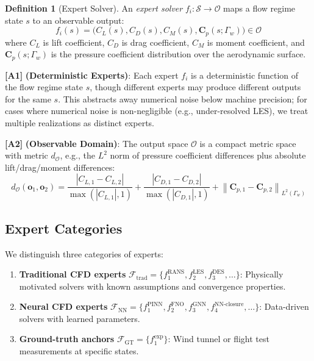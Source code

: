 \documentclass[11pt,a4paper]{article}
\theoremstyle{definition}
\newtheorem{definition}[theorem]{Definition}
\theoremstyle{remark}
\newcommand{\assumptionTag}[1]{\textsf{\textbf{[A#1]}}}
\newcommand{\norm}[1]{\left\lVert#1\right\rVert}
\begin{document}
\begin{definition}[Expert Solver]
An \emph{expert solver} $f_i: \mathcal{S} \to \mathcal{O}$ maps a flow regime state $s$ to an observable output:
\begin{equation}
f_i(s) = \big( C_L(s), C_D(s), C_M(s), \mathbf{C}_p(s; \Gamma_w) \big) \in \mathcal{O}
\label{eq:expert}
\end{equation}
\noindent where $C_L$ is lift coefficient, $C_D$ is drag coefficient, $C_M$ is moment coefficient, and $\mathbf{C}_p(s; \Gamma_w)$ is the pressure coefficient distribution over the aerodynamic surface.
\end{definition}

\assumptionTag{1} \textbf{(Deterministic Experts)}: Each expert $f_i$ is a deterministic function of the flow regime state $s$, though different experts may produce different outputs for the same $s$.
This abstracts away numerical noise below machine precision; for cases where numerical noise is non-negligible (e.g., under-resolved LES), we treat multiple realizations as distinct experts.

\assumptionTag{2} \textbf{(Observable Domain)}: The output space $\mathcal{O}$ is a compact metric space with metric $d_{\mathcal{O}}$, e.g., the $L^2$ norm of pressure coefficient differences plus absolute lift/drag/moment differences:
\begin{equation}
d_{\mathcal{O}}(\mathbf{o}_1, \mathbf{o}_2) = \frac{|C_{L,1} - C_{L,2}|}{\max(|C_{L,1}|,1)} + \frac{|C_{D,1} - C_{D,2}|}{\max(|C_{D,1}|,1)} + \norm{\mathbf{C}_{p,1} - \mathbf{C}_{p,2}}_{L^2(\Gamma_w)}
\label{eq:metric}
\end{equation}

\subsection{Expert Categories}

We distinguish three categories of experts:

\begin{enumerate}[label=(\roman*)]
    \item \textbf{Traditional CFD experts} $\mathcal{F}_{\text{trad}} = \{f_1^{\text{RANS}}, f_2^{\text{LES}}, f_3^{\text{DES}}, \dots\}$: Physically motivated solvers with known assumptions and convergence properties.
    \item \textbf{Neural CFD experts} $\mathcal{F}_{\text{NN}} = \{f_1^{\text{PINN}}, f_2^{\text{FNO}}, f_3^{\text{GNN}}, f_4^{\text{NN-closure}}, \dots\}$: Data-driven solvers with learned parameters.
    \item \textbf{Ground-truth anchors} $\mathcal{F}_{\text{GT}} = \{f_1^{\text{exp}}\}$: Wind tunnel or flight test measurements at specific states.
\end{enumerate}
\end{document}
